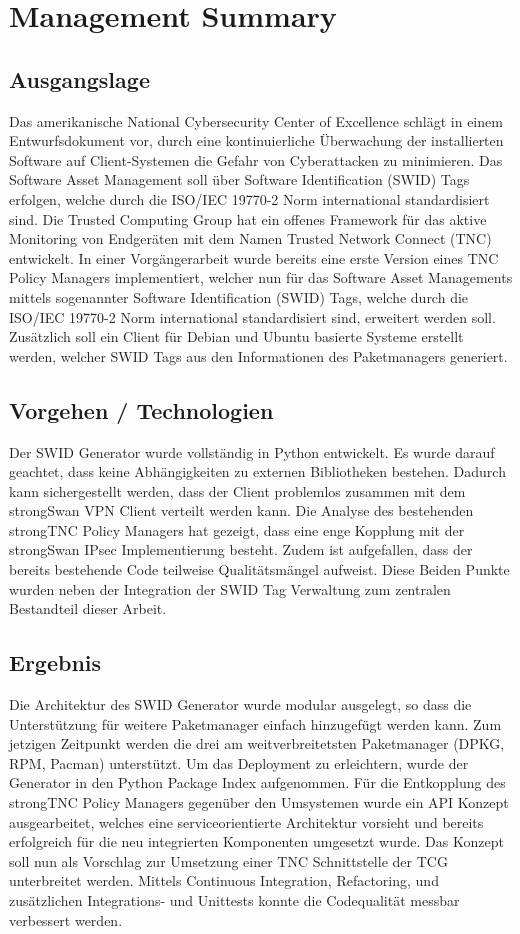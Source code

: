 \chapter{Management Summary}

\section{Ausgangslage}
Das amerikanische National Cybersecurity Center of Excellence schlägt in einem
Entwurfsdokument  vor, durch eine kontinuierliche Überwachung der installierten
Software auf Client-Systemen die Gefahr von Cyberattacken zu minimieren. Das
Software  Asset Management soll über Software Identification (SWID) Tags
erfolgen, welche durch die ISO/IEC 19770-2\cite{iso19770-2} Norm international
standardisiert sind. Die Trusted Computing Group hat ein offenes Framework für
das aktive Monitoring von Endgeräten  mit dem Namen Trusted Network Connect
(TNC) entwickelt. In einer Vorgängerarbeit wurde bereits eine erste Version
eines TNC Policy Managers implementiert, welcher nun für das Software Asset
Managements mittels sogenannter Software Identification (SWID) Tags, welche
durch die ISO/IEC 19770-2 Norm international standardisiert sind,
erweitert werden soll. Zusätzlich soll ein Client für Debian und Ubuntu basierte
Systeme erstellt werden, welcher SWID Tags aus den Informationen des
Paketmanagers generiert.

\section{Vorgehen / Technologien}
Der SWID Generator wurde vollständig in Python entwickelt. Es wurde darauf
geachtet, dass keine Abhängigkeiten zu externen Bibliotheken bestehen. Dadurch
kann sichergestellt werden, dass der Client problemlos zusammen mit dem
strongSwan VPN Client verteilt werden kann. Die Analyse des bestehenden
strongTNC Policy Managers hat gezeigt, dass eine enge Kopplung mit der
strongSwan IPsec Implementierung besteht. Zudem ist aufgefallen, dass der
bereits bestehende Code teilweise Qualitätsmängel aufweist. Diese Beiden Punkte
wurden neben der Integration der SWID Tag Verwaltung zum zentralen Bestandteil
dieser Arbeit.

\section{Ergebnis}
Die Architektur des SWID Generator wurde modular ausgelegt, so dass die
Unterstützung für weitere Paketmanager einfach hinzugefügt werden kann. Zum
jetzigen Zeitpunkt werden die drei am weitverbreitetsten Paketmanager (DPKG,
RPM, Pacman) unterstützt. Um das Deployment zu erleichtern, wurde  der Generator
in den Python Package Index aufgenommen. Für die Entkopplung des strongTNC
Policy Managers gegenüber den Umsystemen wurde ein API Konzept ausgearbeitet,
welches eine serviceorientierte Architektur vorsieht und bereits erfolgreich für
die neu integrierten Komponenten umgesetzt wurde. Das Konzept soll nun als
Vorschlag zur Umsetzung einer TNC Schnittstelle der TCG unterbreitet werden.
Mittels Continuous Integration, Refactoring, und zusätzlichen Integrations- und
Unittests konnte die Codequalität messbar verbessert werden.
